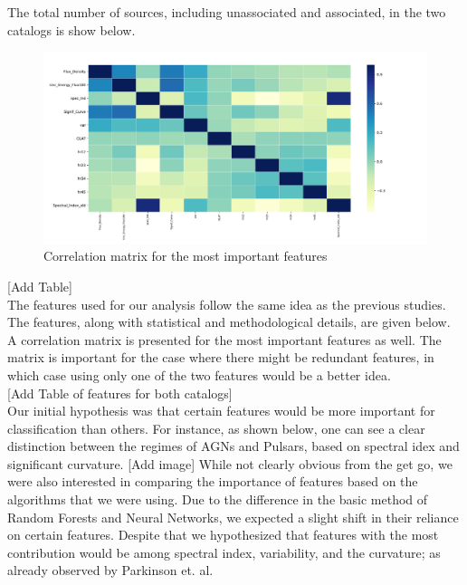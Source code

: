 The total number of sources, including unassociated and associated, in the two catalogs is show below. \\
\begin{figure}[h]
\includegraphics[width=\onepic\textwidth]{plots/correlation.pdf}
\caption{Correlation matrix for the most important features}
\label{fig:corr}
\end{figure}
[Add Table]\\

The features used for our analysis follow the same idea as the previous studies. The features, along with statistical and methodological details, are given below. A correlation matrix is presented for the most important features as well. The matrix is important for the case where there might be redundant features, in which case using only one of the two features would be a better idea.\\



[Add Table of features for both catalogs]\\

Our initial hypothesis was that certain features would be more important for classification than others. For instance, as shown below, one can see a clear distinction between the regimes of AGNs and Pulsars, based on spectral idex and significant curvature. [Add image] While not clearly obvious from the get go, we were also interested in comparing the importance of features based on the algorithms that we were using. Due to the difference in the basic method of Random Forests and Neural Networks, we expected a slight shift in their reliance on certain features. Despite that we hypothesized that features with the most contribution would be among spectral index, variability, and the curvature; as already observed by Parkinson et. al.\\


